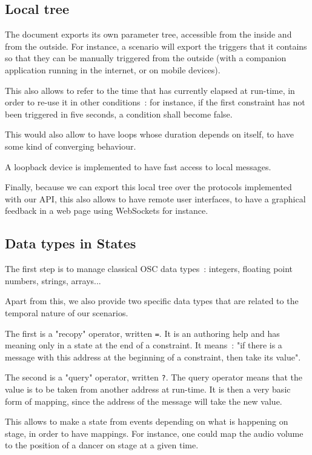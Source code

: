 \documentclass{sigchi}
\begin{document}
\subsection{Local tree}
The document exports its own parameter tree, accessible from the inside and from the outside.
For instance, a scenario will export the triggers that it contains so that they can be manually triggered from the outside (with a companion application running in the internet, or on mobile devices).

This also allows to refer to the time that has currently elapsed at run-time, in order to re-use it in other conditions~: for instance, if the first constraint has not been triggered in five seconds, a condition shall become false.

This would also allow to have loops whose duration depends on itself, to have some kind of converging behaviour.

A loopback device is implemented to have fast access to local messages.

Finally, because we can export this local tree over the protocols implemented with our API, this also allows to have remote user interfaces, to have a graphical feedback in a web page using WebSockets for instance.

\subsection{Data types in States}
The first step is to manage classical OSC data types~: integers, floating point numbers, strings, arrays...

Apart from this, we also provide two specific data types that are related to the temporal nature of our scenarios.

The first is a "recopy" operator, written \texttt{=}. It is an authoring help and has meaning only in a state at the end of a constraint. It means~: "if there is a message with this address at the beginning of a constraint, then take its value".

The second is a "query" operator, written \texttt{?}. The query operator means that the value is to be taken from another address at run-time. It is then a very basic form of mapping, since the address of the message will take the new value.

This allows to make a state from events depending on what is happening on stage, in order to have mappings. For instance, one could map the audio volume to the position of a dancer on stage at a given time.
\end{document}
